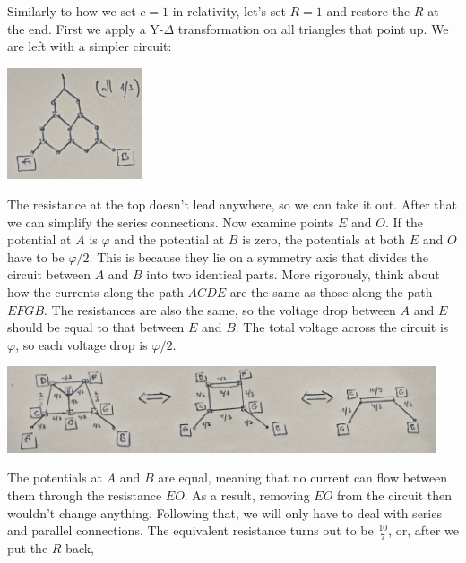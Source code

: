 \documentclass[../TST.tex]{subfiles}
\begin{document}
\ifprob \else
\begin{solution} Similarly to how we set $c=1$ in relativity, let's set $R=1$ and restore the $R$ at the end. First we apply a Y-$\Delta$ transformation on all triangles that point up. We are left with a simpler circuit:
\begin{center}
\includegraphics[width=0.3\textwidth]{fig/a2009_s51.jpg}
\end{center}


The resistance at the top doesn't lead anywhere, so we can take it out. After that we can simplify the series connections. Now examine points $E$ and $O$. If the potential at $A$ is $\varphi$ and the potential at $B$ is zero, the potentials at both $E$ and $O$ have to be $\varphi/2$. This is because they lie on a symmetry axis that divides the circuit between $A$ and $B$ into two identical parts. More rigorously, think about how the currents along the path $ACDE$ are the same as those along the path $EFGB$. The resistances are also the same, so the voltage drop between $A$ and $E$ should be equal to that between $E$ and $B$. The total voltage across the circuit is $\varphi$, so each voltage drop is $\varphi/2$.
\begin{center}
\includegraphics[width=0.95\textwidth]{fig/a2009_s52.jpg}
\end{center}
The potentials at $A$ and $B$ are equal, meaning that no current can flow between them through the resistance $EO$. As a result, removing $EO$ from the circuit then wouldn't change anything. Following that, we will only have to deal with series and parallel connections. The equivalent resistance turns out to be $\frac{10}{7}$, or, after we put the $R$ back, 



\end{solution}
\fi
\end{document}
